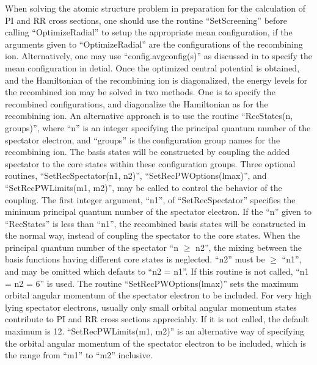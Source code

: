 \documentclass{elsart}
\begin{document}
When solving the atomic structure problem in preparation for the calculation
of PI and RR cross sections, 
one should use the routine ``SetScreening'' before calling
``OptimizeRadial''  to setup the appropriate mean
configuration, if the arguments given to ``OptimizeRadial'' are the
configurations of the recombining ion. Alternatively, one may use
``config.avgconfig(s)'' as 
discussed in  to specify the mean configuration in
detial. Once the optimized central potential is obtained, and the 
Hamiltonian of the recombining ion is diagonalized, the energy levels for the
recombined ion may be solved in two methods. One is to specify the recombined
configurations, and diagonalize the Hamiltonian as for the recombining ion. An
alternative approach is to use the routine ``RecStates(n, groups)'', where
``n'' is an 
integer specifying the principal quantum number of the spectator electron, and
``groups'' is the configuration group names for the recombining ion. The
basis states will be constructed by coupling the added spectator to the core
states within these configuration groups. Three optional routines,
``SetRecSpectator(n1, n2)'', ``SetRecPWOptions(lmax)'', and
``SetRecPWLimits(m1, m2)'', may be called to control the behavior of the
coupling. The first integer argument, ``n1'',  of ``SetRecSpectator''
specifies the minimum principal quantum number of the spectator electron. If
the ``n'' given to ``RecStates'' is less than ``n1'', the recombined basis
states will be constructed in the normal way, instead of coupling the
spectator to the core states. When the principal quantum number of the
spectator ``n $\ge$ n2'', the mixing between the basis functions having
different core 
states is neglected. ``n2'' must be $\ge$ ``n1'', and may be omitted which
defauts to ``n2 = n1''. If this routine is not called, ``n1 = n2 = 6'' is
used. The routine ``SetRecPWOptions(lmax)'' sets the maximum orbital angular
momentum of the spectator electron to be included. For very high lying
spectator electrons, usually only small orbital angular momentum states
contribute to PI and RR cross sections appreciably. If it is not called, the
default maximum is 12. ``SetRecPWLimits(m1, m2)'' is an alternative way of
specifying the orbital angular momentum of the 
spectator electron to be included, which is the range from ``m1'' to ``m2''
inclusive. 
\end{document}
